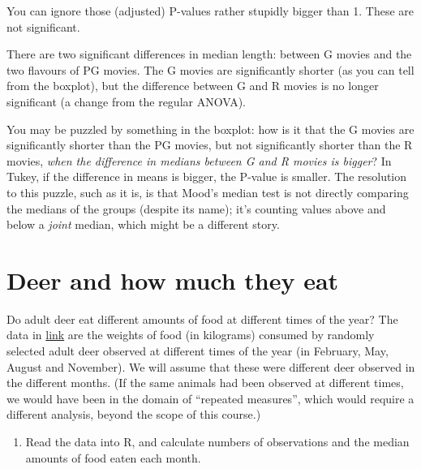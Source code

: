 \documentclass[]{tufte-book}
\providecommand{\tightlist}{%
  \setlength{\itemsep}{0pt}\setlength{\parskip}{0pt}}
\theoremstyle{definition}
\theoremstyle{definition}
\theoremstyle{definition}
\theoremstyle{remark}
\begin{document}
You can ignore those (adjusted) P-values rather stupidly bigger than 1.
These are not significant.

There are two significant differences in median length: between G movies
and the two flavours of PG movies. The G movies are significantly
shorter (as you can tell from the boxplot), but the difference between G
and R movies is no longer significant (a change from the regular ANOVA).

You may be puzzled by something in the boxplot: how is it that the G
movies are significantly shorter than the PG movies, but not
significantly shorter than the R movies, \emph{when the difference in
medians between G and R movies is bigger}? In Tukey, if the difference
in means is bigger, the P-value is smaller.
The resolution to this puzzle, such as it is, is that Mood's median test
is not directly comparing the medians of the groups (despite its name);
it's counting values above and below a \emph{joint} median, which might
be a different story.

\hypertarget{deer-and-how-much-they-eat}{%
\section{Deer and how much they eat}\label{deer-and-how-much-they-eat}}

Do adult deer eat different amounts of food at different times of the
year? The data in
\href{http://www.utsc.utoronto.ca/~butler/c32/deer.txt}{link} are the
weights of food (in kilograms) consumed by randomly selected adult deer
observed at different times of the year (in February, May, August and
November). We will assume that these were different deer observed in the
different months. (If the same animals had been observed at different
times, we would have been in the domain of ``repeated measures'', which
would require a different analysis, beyond the scope of this course.)

\begin{enumerate}
\def\labelenumi{(\alph{enumi})}
\tightlist
\item
  Read the data into R, and calculate numbers of observations and the
  median amounts of food eaten each month.
\end{enumerate}
\end{document}
